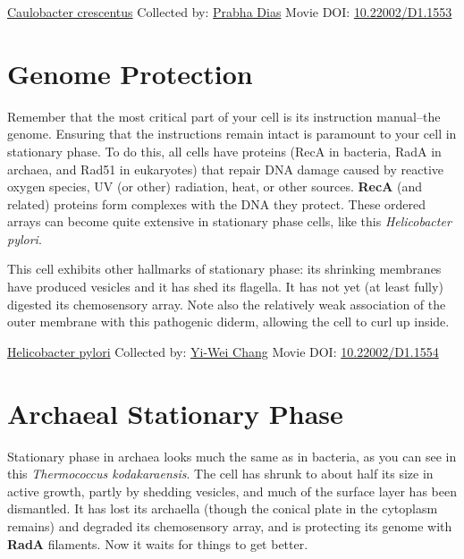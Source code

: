 \documentclass[]{tufte-book}
\begin{document}
\hypertarget{htmlwidget-0d5909dde43a6deceb3a}{}

\label{fig:8-1}\protect\hyperlink{tree}{Caulobacter crescentus} Collected by: \protect\hyperlink{prabha_dias}{Prabha Dias} Movie DOI: \href{https://doi.org/10.22002/D1.1553}{10.22002/D1.1553}

\hypertarget{genome-protection}{%
\section{Genome Protection}\label{genome-protection}}

Remember that the most critical part of your cell is its instruction manual--the genome. Ensuring that the instructions remain intact is paramount to your cell in stationary phase. To do this, all cells have proteins (RecA in bacteria, RadA in archaea, and Rad51 in eukaryotes) that repair DNA damage caused by reactive oxygen species, UV (or other) radiation, heat, or other sources. \textbf{RecA} (and related) proteins form complexes with the DNA they protect. These ordered arrays can become quite extensive in stationary phase cells, like this \emph{Helicobacter pylori}.

This cell exhibits other hallmarks of stationary phase: its shrinking membranes have produced vesicles and it has shed its flagella. It has not yet (at least fully) digested its chemosensory array. Note also the relatively weak association of the outer membrane with this pathogenic diderm, allowing the cell to curl up inside.



\hypertarget{htmlwidget-bf6eed18afe50cfab963}{}

\label{fig:8-2}\protect\hyperlink{tree}{Helicobacter pylori} Collected by: \protect\hyperlink{yi-wei_chang}{Yi-Wei Chang} Movie DOI: \href{https://doi.org/10.22002/D1.1554}{10.22002/D1.1554}

\hypertarget{archaeal-stationary-phase}{%
\section{Archaeal Stationary Phase}\label{archaeal-stationary-phase}}

Stationary phase in archaea looks much the same as in bacteria, as you can see in this \emph{Thermococcus kodakaraensis}. The cell has shrunk to about half its size in active growth, partly by shedding vesicles, and much of the surface layer has been dismantled. It has lost its archaella (though the conical plate in the cytoplasm remains) and degraded its chemosensory array, and is protecting its genome with \textbf{RadA} filaments. Now it waits for things to get better.
\end{document}
